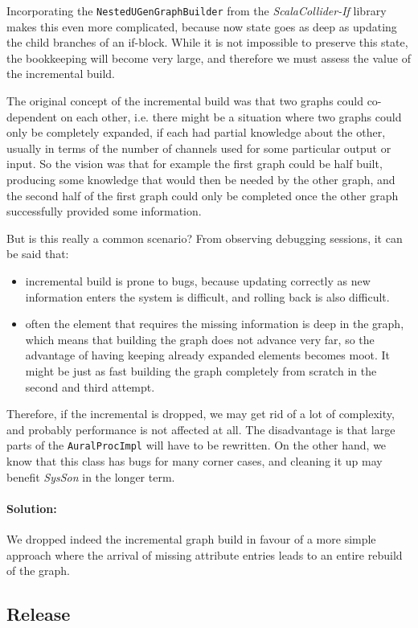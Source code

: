 \documentclass[11pt,a4paper]{article}
\newcommand{\software}[1]{\textit{#1}}
\begin{document}
Incorporating the \Verb!NestedUGenGraphBuilder! from the \software{ScalaCollider-If} library makes this even more complicated, because now state goes as deep as updating the child branches of an if-block. While it is not impossible to preserve this state, the bookkeeping will become very large, and therefore we must assess the value of the incremental build.

The original concept of the incremental build was that two graphs could co-dependent on each other, i.e. there might be a situation where two graphs could only be completely expanded, if each had partial knowledge about the other, usually in terms of the number of channels used for some particular output or input. So the vision was that for example the first graph could be half built, producing some knowledge that would then be needed by the other graph, and the second half of the first graph could only be completed once the other graph successfully provided some information.

But is this really a common scenario? From observing debugging sessions, it can be said that:
%
\begin{itemize}
\item incremental build is prone to bugs, because updating correctly as new information enters the system is difficult, and rolling back is also difficult.
\item often the element that requires the missing information is deep in the graph, which means that building the graph does not advance very far, so the advantage of having keeping already expanded elements becomes moot. It might be just as fast building the graph completely from scratch in the second and third attempt.
\end{itemize}
%
Therefore, if the incremental is dropped, we may get rid of a lot of complexity, and probably performance is not affected at all. The disadvantage is that large parts of the \Verb!AuralProcImpl! will have to be rewritten. On the other hand, we know that this class has bugs for many corner cases, and cleaning it up may benefit \software{SysSon} in the longer term.

\paragraph{Solution:} We dropped indeed the incremental graph build in favour of a more simple approach where the arrival of missing attribute entries leads to an entire rebuild of the graph.

\subsection{Release}
\end{document}
